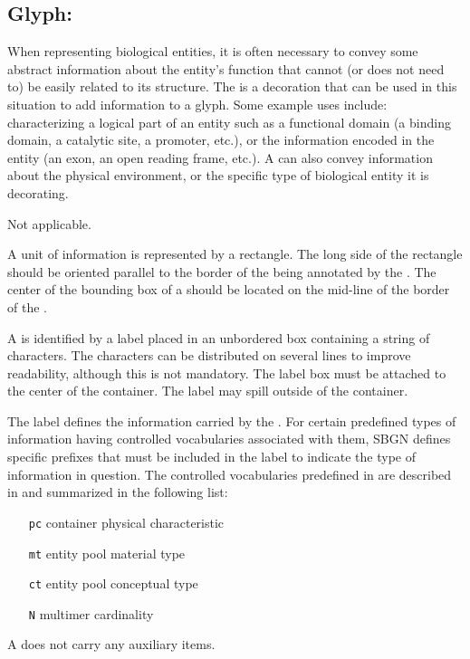 
\subsection{Glyph: }
\label{sec:unitInfo}

When representing biological entities, it is often necessary to convey some abstract information about the entity's function that cannot (or does not need to) be easily related to its structure.  The  is a decoration that can be used in this situation to add information to a glyph.  Some example uses include: characterizing a logical part of an entity such as a functional domain (a binding domain, a catalytic site, a promoter, etc.), or the information encoded in the entity (an exon, an open reading frame, etc.).  A  can also convey information about the physical environment, or the specific type of biological entity it is decorating.

\begin{glyphDescription}

\glyphSboTerm Not applicable.

\glyphContainer A unit of information is represented by a rectangle.  The long side of the rectangle should be oriented parallel to the border of the  being annotated by the . The center of the bounding box of a  should be located on the mid-line of the border of the .

\glyphLabel A  is identified by a label placed in an unbordered box containing a string of characters.  The characters can be distributed on several lines to improve readability, although this is not mandatory.  The label box must be attached to the center of the container.  The label may spill outside of the container.

The label defines the information carried by the .  For certain predefined types of information having controlled vocabularies associated with them, SBGN defines specific prefixes that must be included in the label to indicate the type of information in question.  The controlled vocabularies predefined in \SBGNPDLone are described in  and summarized in the following list:

\begin{center}
  \begin{itemize}\setlength{\parskip}{0ex}
  \item[\texttt{pc}] container physical characteristic
  \item[\texttt{mt}] entity pool material type
  \item[\texttt{ct}] entity pool conceptual type
  \item[\texttt{N}]  multimer cardinality
  \end{itemize}
\end{center}

\glyphAux A  does not carry any auxiliary items.  

\end{glyphDescription}

